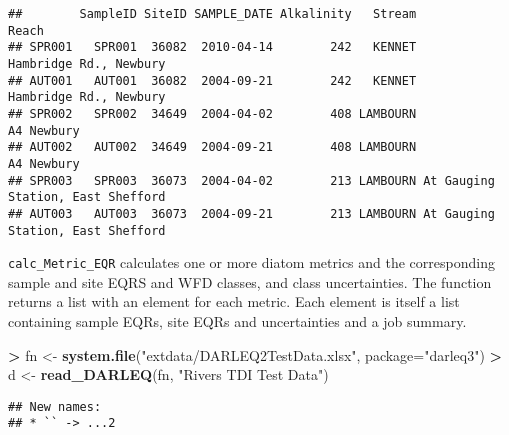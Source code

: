 \documentclass[]{article}
\newenvironment{Shaded}{\begin{snugshade}}{\end{snugshade}}
\newcommand{\KeywordTok}[1]{\textcolor[rgb]{0.13,0.29,0.53}{\textbf{#1}}}
\newcommand{\DataTypeTok}[1]{\textcolor[rgb]{0.13,0.29,0.53}{#1}}
\newcommand{\DecValTok}[1]{\textcolor[rgb]{0.00,0.00,0.81}{#1}}
\newcommand{\StringTok}[1]{\textcolor[rgb]{0.31,0.60,0.02}{#1}}
\newcommand{\OperatorTok}[1]{\textcolor[rgb]{0.81,0.36,0.00}{\textbf{#1}}}
\newcommand{\NormalTok}[1]{#1}
\begin{document}
\begin{Shaded}
\end{Shaded}

\begin{verbatim}
##        SampleID SiteID SAMPLE_DATE Alkalinity   Stream                             Reach
## SPR001   SPR001  36082  2010-04-14        242   KENNET            Hambridge Rd., Newbury
## AUT001   AUT001  36082  2004-09-21        242   KENNET            Hambridge Rd., Newbury
## SPR002   SPR002  34649  2004-04-02        408 LAMBOURN                        A4 Newbury
## AUT002   AUT002  34649  2004-09-21        408 LAMBOURN                        A4 Newbury
## SPR003   SPR003  36073  2004-04-02        213 LAMBOURN At Gauging Station, East Shefford
## AUT003   AUT003  36073  2004-09-21        213 LAMBOURN At Gauging Station, East Shefford
\end{verbatim}

\texttt{calc\_Metric\_EQR} calculates one or more diatom metrics and the
corresponding sample and site EQRS and WFD classes, and class
uncertainties. The function returns a list with an element for each
metric. Each element is itself a list containing sample EQRs, site EQRs
and uncertainties and a job summary.

\begin{Shaded}
\begin{Highlighting}[]
\OperatorTok{>}\StringTok{ }\NormalTok{fn <-}\StringTok{ }\KeywordTok{system.file}\NormalTok{(}\StringTok{"extdata/DARLEQ2TestData.xlsx"}\NormalTok{, }\DataTypeTok{package=}\StringTok{"darleq3"}\NormalTok{)}
\OperatorTok{>}\StringTok{ }\NormalTok{d <-}\StringTok{ }\KeywordTok{read_DARLEQ}\NormalTok{(fn, }\StringTok{"Rivers TDI Test Data"}\NormalTok{)}
\end{Highlighting}
\end{Shaded}

\begin{verbatim}
## New names:
## * `` -> ...2
\end{verbatim}

\begin{Shaded}
\end{Shaded}
\end{document}

